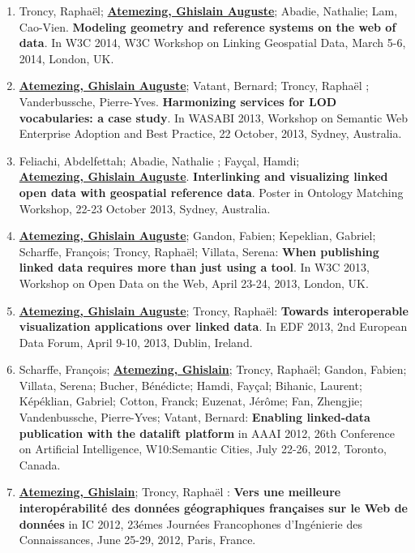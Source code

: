 \begin{enumerate}
\item Troncy, Rapha{\"e}l; \underline{\textbf{Atemezing, Ghislain Auguste}}; Abadie, Nathalie; Lam, Cao-Vien. \textbf{Modeling geometry and reference systems on the web of data}. In W3C 2014, W3C Workshop on Linking Geospatial Data, March 5-6, 2014, London, UK.

\item \underline{\textbf{Atemezing, Ghislain Auguste}}; Vatant, Bernard; Troncy, Rapha{\"e}l ; Vanderbussche, Pierre-Yves. \textbf{Harmonizing services for LOD vocabularies: a case study}. In WASABI 2013, Workshop on Semantic Web Enterprise Adoption and Best Practice, 22 October, 2013, Sydney, Australia.

\item Feliachi, Abdelfettah; Abadie, Nathalie ; Fay\c cal, Hamdi;\\ \underline{\textbf{Atemezing, Ghislain Auguste}}. \textbf{{I}nterlinking and visualizing linked open data with geospatial reference data}. Poster in Ontology Matching Workshop, 22-23 October 2013, Sydney, Australia.

\item \underline{\textbf{Atemezing, Ghislain Auguste}}; Gandon, Fabien; Kepeklian, Gabriel; Scharffe, Fran\c{c}ois; Troncy, Rapha{\"e}l; Villata, Serena: 
\textbf{When publishing linked data requires more than just using a tool}. In 
W3C 2013, Workshop on Open Data on the Web, April 23-24, 2013, London, UK.

\item \underline{\textbf{Atemezing, Ghislain Auguste}}; Troncy,  Rapha{\"e}l: \textbf{
Towards interoperable visualization applications over linked data}. In 
EDF 2013, 2nd European Data Forum, April 9-10, 2013, Dublin, Ireland.


\item Scharffe, Fran\c cois; \underline{\textbf{Atemezing, Ghislain}}; Troncy, Rapha\"{e}l; Gandon, Fabien; Villata, Serena; Bucher, B\'{e}n\'{e}dicte; Hamdi, Fay\c cal; Bihanic, Laurent; K\'{e}p\'{e}klian, Gabriel; Cotton, Franck; Euzenat, J\'{e}r\^{o}me; Fan, Zhengjie; Vandenbussche, Pierre-Yves; Vatant, Bernard: \textbf{Enabling linked-data publication with the datalift platform} in
AAAI 2012, 26th Conference on Artificial Intelligence, W10:Semantic Cities, July 22-26, 2012, Toronto, Canada.


\item \underline{\textbf{Atemezing, Ghislain}}; Troncy, Rapha\"{e}l : \textbf{Vers une meilleure interop\'{e}rabilit\'{e} des donn\'{e}es g\'{e}ographiques fran\c caises sur le Web de donn\'{e}es} in IC 2012, 23\'{e}mes Journ\'{e}es Francophones d'Ing\'{e}nierie des Connaissances, June 25-29, 2012, Paris, France.


\end{enumerate}
